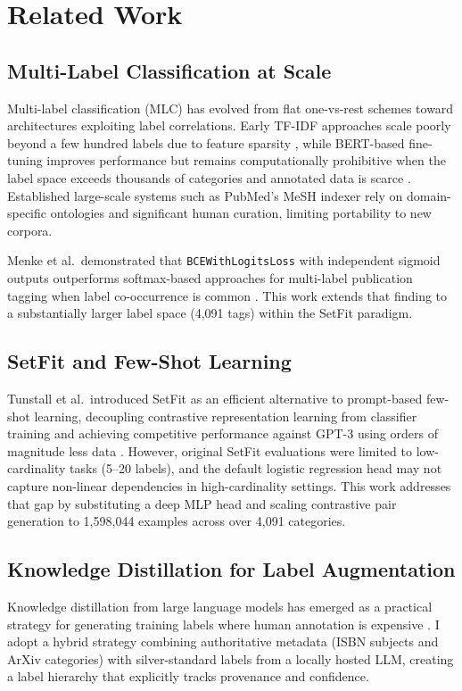 \documentclass[10pt,journal,compsoc]{IEEEtran}
\newcommand{\NumTagsAblation}{4,091}
\newcommand{\ContrastivePairs}{1,598,044}
\begin{document}
	\section{Related Work}
	
	\subsection{Multi-Label Classification at Scale}
	Multi-label classification (MLC) has evolved from flat one-vs-rest schemes toward
	architectures exploiting label correlations. Early TF-IDF approaches scale poorly
	beyond a few hundred labels due to feature sparsity \cite{abbas_automated_2023},
	while BERT-based fine-tuning improves performance but remains computationally
	prohibitive when the label space exceeds thousands of categories and annotated data
	is scarce \cite{minilm}. Established large-scale systems such as PubMed's MeSH
	indexer rely on domain-specific ontologies and significant human curation, limiting
	portability to new corpora.
	
	Menke et al.\ demonstrated that \texttt{BCEWithLogitsLoss} with independent sigmoid
	outputs outperforms softmax-based approaches for multi-label publication tagging when
	label co-occurrence is common \cite{menke_publication_2025}. This work extends that
	finding to a substantially larger label space (\NumTagsAblation{} tags) within the SetFit paradigm.
	
	\subsection{SetFit and Few-Shot Learning}
	Tunstall et al.\ introduced SetFit as an efficient alternative to prompt-based
	few-shot learning, decoupling contrastive representation learning from classifier
	training and achieving competitive performance against GPT-3 using orders of magnitude
	less data \cite{tunstall_efficient_2022}. However, original SetFit evaluations were
	limited to low-cardinality tasks (5--20 labels), and the default logistic regression
	head may not capture non-linear dependencies in high-cardinality settings. This work
	addresses that gap by substituting a deep MLP head and scaling contrastive pair
	generation to \ContrastivePairs{} examples across over \NumTagsAblation{} categories.
	
	\subsection{Knowledge Distillation for Label Augmentation}
	Knowledge distillation from large language models has emerged as a practical strategy
	for generating training labels where human annotation is expensive
	\cite{hinton_distilling_2015}. I adopt a hybrid strategy combining authoritative
	metadata (ISBN subjects and ArXiv categories) with silver-standard labels from a
	locally hosted LLM, creating a label hierarchy that explicitly tracks provenance
	and confidence.
	
\end{document}

